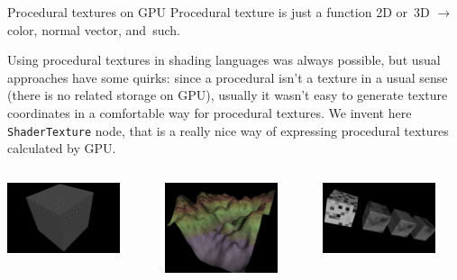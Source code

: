 \documentclass{beamer}
\begin{document}
\begin{frame}[fragile]{Procedural textures on GPU}
Procedural texture is just a function 2D or~3D $\rightarrow$
color, normal vector, and~such.

\vspace{0.1in}

Using procedural textures in shading languages was always possible,
but usual approaches have some quirks: since a procedural isn't a texture
in a usual sense (there is no related storage on GPU), usually it wasn't
easy to generate texture coordinates in a comfortable way for procedural
textures. We invent here \texttt{ShaderTexture} node, that is a really
nice way of expressing procedural textures calculated by GPU.

\begin{center}
\begin{columns}[T]
  \begin{column}{1in}
    \includegraphics[width=1.3in]{../shader_texture_edge_detection}
  \end{column}
  \begin{column}{1in}
    \includegraphics[width=1.3in]{../terrain}
  \end{column}
  \begin{column}{1in}
    \includegraphics[width=1.3in]{../noise}
  \end{column}
\end{columns}
\end{center}

\end{frame}
\end{document}
